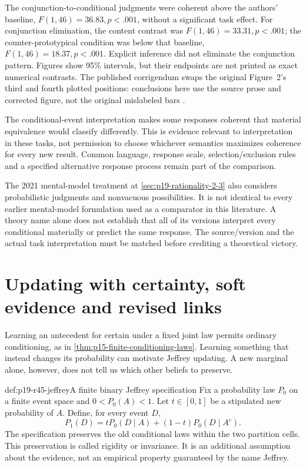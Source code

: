 The conjunction-to-conditional judgments were coherent above the
authors' baseline, \(F(1,46)=36.83,p<.001\), without a significant
task effect. For conjunction elimination, the content contrast was
\(F(1,46)=33.31,p<.001\); the counter-prototypical condition was
below that baseline, \(F(1,46)=18.37,p<.001\). Explicit inference
did not eliminate the conjunction pattern. Figures show 95\% intervals,
but their endpoints are not printed as exact numerical contrasts.
The published corrigendum swaps the original Figure~2's third and
fourth plotted positions: conclusions here use the source prose and
corrected figure, not the original mislabeled bars
\cite[pp.~5--7]{CruzEtAl2015Coherence}
\cite{CruzEtAl2015CoherenceCorrigendum}.

The conditional-event interpretation makes some responses coherent
that material equivalence would classify differently. This is evidence
relevant to interpretation in these tasks, not permission to choose
whichever semantics maximizes coherence for every new result. Common
language, response scale, selection/exclusion rules and a specified
alternative response process remain part of the comparison.

The 2021 mental-model treatment at \cref{sec:p19-rationality-2-3}
also considers probabilistic judgments and nonvacuous possibilities.
It is not identical to every earlier mental-model formulation used as
a comparator in this literature. A theory name alone does not establish
that all of its versions interpret every conditional materially or
predict the same response. The source/version and the actual task
interpretation must be matched before crediting a theoretical victory.

\section{Updating with certainty, soft evidence and revised links}
\label{sec:p19-r45-updating}

Learning an antecedent for certain under a fixed joint law permits
ordinary conditioning, as in \cref{thm:p15-finite-conditioning-laws}.
Learning something that instead changes its probability can motivate
Jeffrey updating. A new marginal alone, however, does not tell us which
other beliefs to preserve.

\begin{hbdefinition}{def:p19-r45-jeffrey}{A finite binary Jeffrey specification}
Fix a probability law \(P_0\) on a finite event space and
\(0<P_0(A)<1\). Let \(t\in[0,1]\) be a stipulated new
probability of \(A\). Define, for every event \(D\),
\[
 P_1(D)=tP_0(D\mid A)+(1-t)P_0(D\mid A^c).
\]
The specification preserves the old conditional laws within the two
partition cells. This preservation is called rigidity or invariance.
It is an additional assumption about the evidence, not an empirical
property guaranteed by the name Jeffrey.
\end{hbdefinition}

